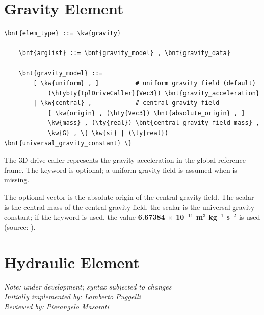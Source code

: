 \section{Gravity Element}
\begin{Verbatim}[commandchars=\\\{\}]
    \bnt{elem_type} ::= \kw{gravity}

    \bnt{arglist} ::= \bnt{gravity_model} , \bnt{gravity_data}

    \bnt{gravity_model} ::=
        [ \kw{uniform} , ]          # uniform gravity field (default)
            (\htybty{TplDriveCaller}{Vec3}) \bnt{gravity_acceleration}
        | \kw{central} ,            # central gravity field
            [ \kw{origin} , (\hty{Vec3}) \bnt{absolute_origin} , ]
            \kw{mass} , (\ty{real}) \bnt{central_gravity_field_mass} ,
            \kw{G} , \{ \kw{si} | (\ty{real}) \bnt{universal_gravity_constant} \}
\end{Verbatim}
The 3D drive caller  represents
the gravity acceleration in the global reference frame.
The keyword  is optional; a uniform gravity field
is assumed when  is missing.

The optional vector  is the absolute origin of the central gravity field.
The scalar  is the central mass of the central gravity field.
the scalar  is the universal gravity constant;
if the keyword  is used, the value \textbf{6.67384 $\times$ 10$^{-11}$ m$^3$ kg$^{-1}$ s$^{-2}$} is used \\
(source: ).




\section{Hydraulic Element}
\label{sec:EL:HYDR}
{\em 
    Note: under development; syntax subjected to changes \\
    Initially implemented by: Lamberto Puggelli \\
    Reviewed by: Pierangelo Masarati
}

